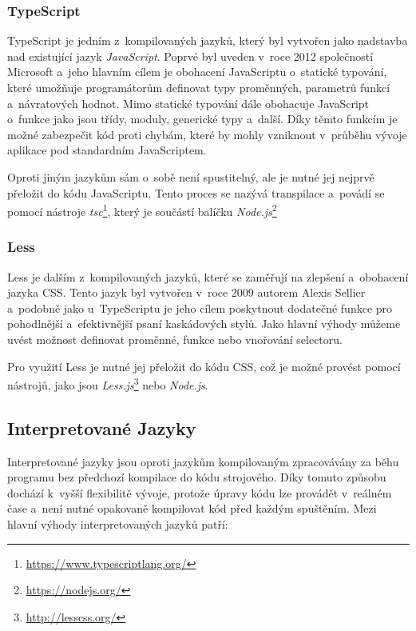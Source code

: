 \subsubsection*{TypeScript}
\label{subsubsec:languages-compiled-typescript}
TypeScript je jedním z~kompilovaných jazyků, který byl vytvořen jako nadstavba nad existující jazyk \textit{JavaScript}. Poprvé byl uveden v~roce 2012 společností Microsoft a~jeho hlavním cílem je obohacení JavaScriptu o~statické typování, které umožňuje programátorům definovat typy proměnných, parametrů funkcí a~návratových hodnot. Mimo statické typování dále obohacuje JavaScript o~funkce jako jsou třídy, moduly, generické typy a~další. Díky těmto funkcím je možné zabezpečit kód proti chybám, které by mohly vzniknout v~průběhu vývoje aplikace pod standardním JavaScriptem.

Oproti jiným jazykům sám o~sobě není spustitelný, ale je nutné jej nejprvě přeložit do kódu JavaScriptu. Tento proces se nazývá transpilace a~povádí se pomocí nástroje \textit{tsc}\footnote{\href{https://www.typescriptlang.org/}{https://www.typescriptlang.org/}}, který je součástí balíčku \textit{Node.js}\footnote{\href{https://nodejs.org/}{https://nodejs.org/}}

\subsubsection*{Less}
\label{subsubsec:languages-compiled-less}
Less je dalším z~kompilovaných jazyků, které se zaměřují na zlepšení a~obohacení jazyka CSS. Tento jazyk byl vytvořen v~roce 2009 autorem Alexis Sellier a~podobně jako u~TypeScriptu je jeho cílem poskytnout dodatečné funkce pro pohodlnější a~efektivnější psaní kaskádových stylů. Jako hlavní výhody můžeme uvést možnost definovat proměnné, funkce nebo vnořování selectoru.

Pro využití Less je nutné jej přeložit do kódu CSS, což je možné provést pomocí nástrojů, jako jsou \textit{Less.js}\footnote{\href{http://lesscss.org/}{http://lesscss.org/}} nebo \textit{Node.js}.

\subsection{Interpretované Jazyky}
\label{subsec:languages-interpreted}
Interpretované jazyky jsou oproti jazykům kompilovaným zpracovávány za běhu programu bez předchozí kompilace do kódu strojového. Díky tomuto způsobu dochází k~vyšší flexibilitě vývoje, protože úpravy kódu lze provádět v~reálném čase a~není nutné opakovaně kompilovat kód před každým spuštěním. Mezi hlavní výhody interpretovaných jazyků patří:

